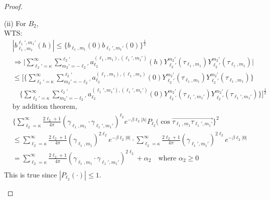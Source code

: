 \documentclass[11pt]{article}
\begin{document}
\begin{itemize}
\begin{proof}
\begin{enumerate}
(ii) For $B_2$,\\
WTS:\\
\begin{align*}
&|b_{\ell_1,m_1}^{\ell_1',m_1'}(h)| \le \{b_{\ell_1,m_1}(0) b_{\ell_1',m_1'}(0)\}^\frac{1}{2}\\
&\Rightarrow \biggl| \sum_{\ell_2'=\kappa}^{\infty} \sum_{m_2'=-\ell_2'}^{\ell_2'} a_{\ell_2}^{(\ell_1,m_1), (\ell_1',m_1')}(h) Y_{\ell_2'}^{m_2'}(\tau_{\ell_1,m_1}) Y_{\ell_2'}^{m_2'}(\tau_{\ell_1,m_1}) \biggl|\\
&\le \Biggl[ \biggl\{ \sum_{\ell_2'=\kappa}^{\infty} \sum_{m_2'=-\ell_2'}^{\ell_2'} a_{\ell_2}^{(\ell_1,m_1), (\ell_1,m_1)}(0) Y_{\ell_2'}^{m_2'}(\tau_{\ell_1,m_1}) Y_{\ell_2'}^{m_2'}(\tau_{\ell_1,m_1}) \biggl\}\\ 
&\quad  \biggl\{ \sum_{\ell_2'=\kappa}^{\infty} \sum_{m_2'=-\ell_2'}^{\ell_2'} a_{\ell_2}^{(\ell_1',m_1'), (\ell_1',m_1')}(0) Y_{\ell_2'}^{m_2'}(\tau_{\ell_1',m_1'}) Y_{\ell_2'}^{m_2'}(\tau_{\ell_1',m_1'}) \biggl\} \Biggl]^\frac{1}{2}\\
&\text{by addition theorem, }\\
&\biggl\{ \sum_{\ell_2=\kappa}^{\infty} \frac{2\ell_2 + 1}{4\pi} (\gamma_{\ell_1, m_1} \cdot \gamma_{\ell_1',m_1'})^{\ell_2} e^{-\beta \ell_2 |h|} P_{\ell_2}(\cos{\overrightarrow{\tau_{\ell_1,m_1} \tau_{\ell_1',m_1'}}}\biggl\}^2\\
&\le \sum_{\ell_2=\kappa}^{\infty} \frac{2\ell_2 + 1}{4\pi} (\gamma_{\ell_1, m_1})^{2 \ell_2} e^{-\beta \ell_2 |0|} \cdot \sum_{\ell_2=\kappa}^{\infty} \frac{2\ell_2 + 1}{4\pi} (\gamma_{\ell_1', m_1'})^{2 \ell_2} e^{-\beta \ell_2 |0|}\\
&= \sum_{\ell_2=\kappa}^{\infty} \frac{2\ell_2 + 1}{4\pi} (\gamma_{\ell_1, m_1} \cdot \gamma_{\ell_1', m_1'})^{2 \ell_2} + \alpha_2 \quad \text{where } \alpha_2 \ge 0\\
\end{align*}
This is true since $|P_{\ell_2}(\cdot)| \le 1$.\\


\end{enumerate}
\end{proof}
\end{itemize}
\end{document}
